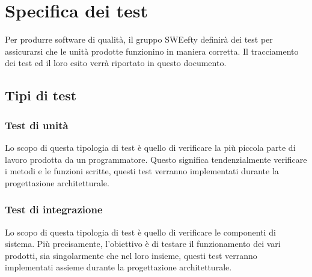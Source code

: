 \section{Specifica dei test}
Per produrre software di qualità, il gruppo SWEefty definirà dei test per assicurarsi che le unità prodotte funzionino in maniera corretta. Il tracciamento dei test ed il loro esito verrà riportato in questo documento.
	\subsection{Tipi di test}
		
	\subsubsection{Test di unità}
    Lo scopo di questa tipologia di test è quello di verificare la più piccola parte di lavoro prodotta da un programmatore. Questo significa tendenzialmente verificare i metodi e le funzioni scritte, questi test verranno implementati durante la progettazione architetturale.
	
	\subsubsection{Test di integrazione}
	Lo scopo di questa tipologia di test è quello di verificare le componenti di sistema. Più	precisamente, l’obiettivo è di testare il funzionamento dei vari  prodotti, sia singolarmente che nel loro insieme, questi test verranno implementati assieme durante la progettazione architetturale.
		
		
